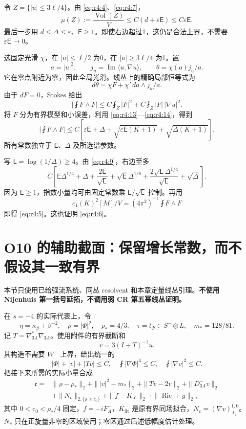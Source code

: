 \documentclass[UTF8,11pt,fontset=none]{ctexart}
\begin{document}
令 \(Z=\{|u|\le3\ell/4\}\)。由 \eqref{eq:r4:4}、\eqref{eq:r4:7}， \[
\mu(Z):=\frac{\operatorname{Vol}(Z)}V
\le C(d+\varepsilon\mathsf E)
\le C\varepsilon\mathsf E.
\tag{4.14}\label{eq:r4:14}
\] 最后一步用 \(d\le\Delta\le\varepsilon\)、\(\mathsf E\ge1\)。即使右边超过1，这仍是合法上界，不需要 \(\varepsilon\mathsf E\to0\)。

选固定光滑 \(\chi\)，在 \(|u|\le\ell/2\) 为0，在 \(|u|\ge3\ell/4\) 为1。置 \[
a=|u|^2,\qquad j_u=\operatorname{Im}\langle u,\nabla u\rangle,
\qquad\theta=\chi(a)j_u/a.
\] 它在零点附近为零，因此全局光滑。线丛上的精确局部恒等式为 \[
d\theta=\chi F+\chi'\,da\wedge j_u/a.
\tag{4.15}\label{eq:r4:15}
\] 由于 \(dF=0\)，Stokes 给出 \[
\left|\fint F\wedge F\right|
\le C\fint_Z|F|^2+C\fint_Z|F|\,|\nabla u|^2.
\tag{4.16}\label{eq:r4:16}
\] 将 \(F\) 分为有界模型和小误差，利用 \eqref{eq:r4:13}---\eqref{eq:r4:14}，得到 \[
\left|\fint F\wedge F\right|
\le C\left[
\varepsilon\mathsf E+\Delta
+\sqrt{\varepsilon\mathsf E(K+1)}
+\sqrt{\Delta(K+1)}\right].
\tag{4.17}\label{eq:r4:17}
\] 所有常数独立于 \(\mathsf E\)、\(\Delta\) 及所选谱参数。

写 \(\mathsf L=\log(1/\Delta)\ge4\)。由 \eqref{eq:r4:9}，右边至多 \[
C\left[
\mathsf E\Delta^{1/4}+\Delta
+\frac{2\mathsf E}{\sqrt{\mathsf L}}
+\sqrt{\mathsf E}\Delta^{1/8}
+\frac{2\sqrt{\mathsf E}\Delta^{1/4}}{\sqrt{\mathsf L}}
+\sqrt\Delta\right].
\] 因为 \(\mathsf E\ge1\)，指数小量均可由固定常数乘 \(\mathsf E/\sqrt{\mathsf L}\) 控制。再用 \[
c_1(K)^2[M]/V=(4\pi^2)^{-1}\fint F\wedge F
\] 即得 \eqref{eq:r4:5}。这也证明 \eqref{eq:r4:6}。

\section{O10 的辅助截面：保留增长常数，而不假设其一致有界}\label{ch4:o10-ux7684ux8f85ux52a9ux622aux9762ux4fddux7559ux589eux957fux5e38ux6570ux800cux4e0dux5047ux8bbeux5176ux4e00ux81f4ux6709ux754c}

本节只使用已给强流系统、同丛 resolvent 和本章定量线丛引理。\textbf{不使用 Nijenhuis 第一括号延拓，不调用弱 CR 第五幂线丛证明。}

在 \(s=-4\) 的实际代表上，令 \[
\eta=\kappa_\beta+\beta^{-2},\quad
\rho=|\Phi|^2,\quad\rho_*=4/3,\quad
\tau=t_\Phi\in S^-\otimes L,\quad m_*=128/81.
\] 记 \(T=\nabla_{3A}^*\nabla_{3A}\)。使用附件的有界截断和 \[
v=3(I+T)^{-1}u.
\tag{4.18}\label{eq:r4:18}
\] 其构造不需要 \(W^-\) 上界，给出统一的 \[
|\Phi|+|v|+|Tv|\le C,\quad
\fint|\nabla\Phi|^4\le C,\quad
\fint|\nabla v|^2\le C.
\tag{4.19}\label{eq:r4:19}
\] 把接下来所需的实际小量合成 \[
\begin{aligned}
\mathfrak e={}&
\|\rho-\rho_*\|_2+
\||v|^2-m_*\|_2+
\|Tv-2v\|_2+
\|D^-_{3A}v\|_2\\
&+\|N_v\|_{2,\{\rho\ge c_0\}}
+\|f-K_{\mathrm{fit}}\|_2
+\|\operatorname{Ric}+g\|_2,
\end{aligned}
\tag{4.20}\label{eq:r4:20}
\] 其中 \(0<c_0<\rho_*/4\) 固定，\(f=-iF_A^-\)，\(K_{\mathrm{fit}}\) 是原有界同场拟合，\(N_v=(\nabla v)^{1,0}_{J_+}\)。\(N_v\) 只在正旋量非零的区域使用；零区通过后述低幅度估计处理。
\end{document}

